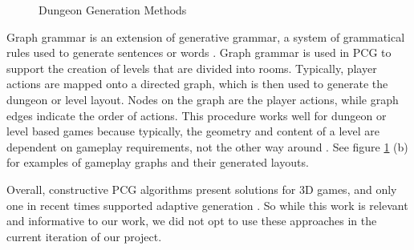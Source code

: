 \documentclass[11pt, oneside]{article}
\begin{document}
\begin{normalsize}
\begin{figure}[H]%
    \centering
    \qquad
    \caption{Dungeon Generation Methods}%
    \label{fig:dungeon}%
\end{figure}

Graph grammar is an extension of generative grammar, a system of grammatical rules used to generate sentences or words \cite{thompson2017generative}. Graph grammar is used in PCG to support the creation of levels that are divided into rooms. Typically, player actions are mapped onto a directed graph, which is then used to generate the dungeon or level layout. Nodes on the graph are the player actions, while graph edges indicate the order of actions. This procedure works well for dungeon or level based games because typically, the geometry and content of a level are dependent on gameplay requirements, not the other way around \cite{van2013designing}. See figure \ref{fig:dungeon} (b) for examples of gameplay graphs and their generated layouts.

Overall, constructive PCG algorithms present solutions for 3D games, and only one in recent times supported adaptive generation \cite{viana2019survey}. So while this work is relevant and informative to our work, we did not opt to use these approaches in the current iteration of our project.


\end{normalsize}
\end{document}
